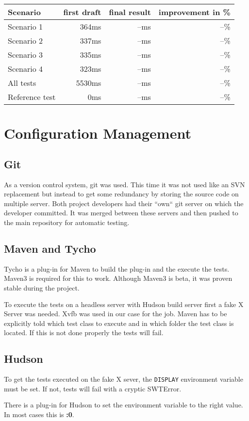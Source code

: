 \begin{tabular}[t]{l|rrr}
 Scenario   & first draft & final result & improvement in \% \\
 \hline
 Scenario 1	&  364ms & --ms & --\% \\
 Scenario 2	&  337ms & --ms & --\% \\
 Scenario 3	&  335ms & --ms & --\% \\
 Scenario 4	&  323ms & --ms & --\% \\
 All tests	& 5530ms & --ms & --\% \\
 Reference test	&    0ms & --ms & --\% \\
\end{tabular}

\section{Configuration Management}

\subsection{Git}

As a version control system, git was used. This time it was not used like an SVN
replacement but instead to get some redundancy by storing the source code on
multiple server. Both project developers had their ``own`` git server on which
the developer committed. It was merged between these servers and then pushed to
the main repository for automatic testing.

\subsection{Maven and Tycho}

Tycho is a plug-in for Maven to build the plug-in and the execute the tests.
Maven3 is required for this to work. Although Maven3 is beta, it was proven
stable during the project.

To execute the tests on a headless server with Hudson build server first a fake
X Server was needed. Xvfb was used in our case for the job. Maven has to be
explicitly told which test class to execute and in which folder the test class
is located. If this is not done properly the tests will fail.

\subsection{Hudson}

To get the tests executed on the fake X sever, the \texttt{DISPLAY} environment
variable must be set. If not, tests will fail with a cryptic
SWTError.

There is a plug-in for Hudson to set the environment variable to
the right value. In most cases this is \textbf{:0}.

